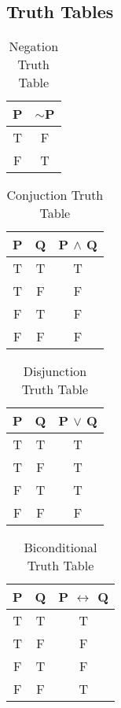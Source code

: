 \newpage

\subsection{Truth Tables}

\begin{multicols}{2}

\begin{table}[H]
\centering
\caption{Negation Truth Table}
\begin{tabular}[t]{|c|c|}
\hline
\textbf{P} & \textbf{$\sim$P} \\ \hline
T & F \\ \hline
F & T \\ \hline
\end{tabular}
\end{table}

\begin{table}[H]
\centering
\caption{Conjuction Truth Table}
\begin{tabular}[t]{|c|c|c|}
\hline
\textbf{P} & \textbf{Q} & \textbf{P $\land$ Q} \\ \hline
T & T & T \\ \hline
T & F & F \\ \hline
F & T & F \\ \hline
F & F & F \\ \hline
\end{tabular}
\end{table}

\begin{table}[H]
\centering
\caption{Disjunction Truth Table}
\begin{tabular}[t]{|c|c|c|}
\hline
\textbf{P} & \textbf{Q} & \textbf{P $\lor$ Q} \\ \hline
T & T & T \\ \hline
T & F & T \\ \hline
F & T & T \\ \hline
F & F & F \\ \hline
\end{tabular}
\end{table}

\begin{table}[H]
\centering
\caption{Biconditional Truth Table}
\begin{tabular}[t]{|c|c|c|}
\hline
\textbf{P} & \textbf{Q} & \textbf{P $\leftrightarrow$ Q} \\ \hline
T & T & T \\ \hline
T & F & F \\ \hline
F & T & F \\ \hline
F & F & T \\ \hline
\end{tabular}
\end{table}


\end{multicols}
